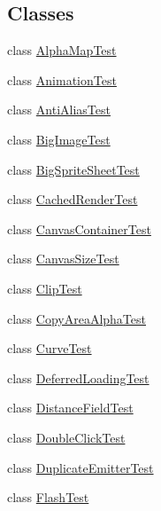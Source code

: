 \subsection*{Classes}
\begin{DoxyCompactItemize}
\item 
class \mbox{\hyperlink{classorg_1_1newdawn_1_1slick_1_1tests_1_1_alpha_map_test}{Alpha\+Map\+Test}}
\item 
class \mbox{\hyperlink{classorg_1_1newdawn_1_1slick_1_1tests_1_1_animation_test}{Animation\+Test}}
\item 
class \mbox{\hyperlink{classorg_1_1newdawn_1_1slick_1_1tests_1_1_anti_alias_test}{Anti\+Alias\+Test}}
\item 
class \mbox{\hyperlink{classorg_1_1newdawn_1_1slick_1_1tests_1_1_big_image_test}{Big\+Image\+Test}}
\item 
class \mbox{\hyperlink{classorg_1_1newdawn_1_1slick_1_1tests_1_1_big_sprite_sheet_test}{Big\+Sprite\+Sheet\+Test}}
\item 
class \mbox{\hyperlink{classorg_1_1newdawn_1_1slick_1_1tests_1_1_cached_render_test}{Cached\+Render\+Test}}
\item 
class \mbox{\hyperlink{classorg_1_1newdawn_1_1slick_1_1tests_1_1_canvas_container_test}{Canvas\+Container\+Test}}
\item 
class \mbox{\hyperlink{classorg_1_1newdawn_1_1slick_1_1tests_1_1_canvas_size_test}{Canvas\+Size\+Test}}
\item 
class \mbox{\hyperlink{classorg_1_1newdawn_1_1slick_1_1tests_1_1_clip_test}{Clip\+Test}}
\item 
class \mbox{\hyperlink{classorg_1_1newdawn_1_1slick_1_1tests_1_1_copy_area_alpha_test}{Copy\+Area\+Alpha\+Test}}
\item 
class \mbox{\hyperlink{classorg_1_1newdawn_1_1slick_1_1tests_1_1_curve_test}{Curve\+Test}}
\item 
class \mbox{\hyperlink{classorg_1_1newdawn_1_1slick_1_1tests_1_1_deferred_loading_test}{Deferred\+Loading\+Test}}
\item 
class \mbox{\hyperlink{classorg_1_1newdawn_1_1slick_1_1tests_1_1_distance_field_test}{Distance\+Field\+Test}}
\item 
class \mbox{\hyperlink{classorg_1_1newdawn_1_1slick_1_1tests_1_1_double_click_test}{Double\+Click\+Test}}
\item 
class \mbox{\hyperlink{classorg_1_1newdawn_1_1slick_1_1tests_1_1_duplicate_emitter_test}{Duplicate\+Emitter\+Test}}
\item 
class \mbox{\hyperlink{classorg_1_1newdawn_1_1slick_1_1tests_1_1_flash_test}{Flash\+Test}}

\end{DoxyCompactItemize}
